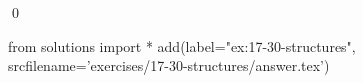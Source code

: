 
\begin{ex}
  \label{ex:17-30-structures}
  
  \qed
\end{ex}
\begin{python0}
from solutions import *
add(label="ex:17-30-structures",
    srcfilename='exercises/17-30-structures/answer.tex')
\end{python0}
